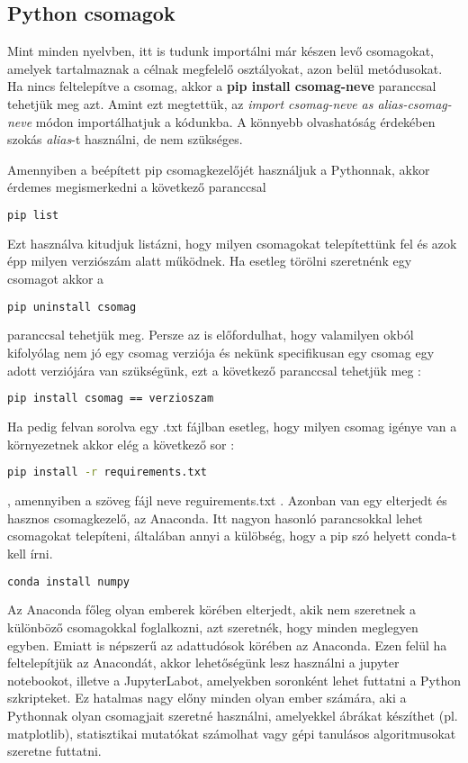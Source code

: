 \documentclass{article}
\theoremstyle{definition}
\theoremstyle{theorem}
\begin{document}
\subsection{Python csomagok}
Mint minden nyelvben, itt is tudunk importálni már készen levő csomagokat, amelyek tartalmaznak a célnak megfelelő osztályokat, azon belül metódusokat. Ha nincs feltelepítve a csomag, akkor a \textbf{pip install csomag-neve} paranccsal tehetjük meg azt.
Amint ezt megtettük, az \textit{import csomag-neve as alias-csomag-neve} módon importálhatjuk a kódunkba. A könnyebb olvashatóság érdekében szokás \textit{alias}-t használni, de nem szükséges.


Amennyiben a beépített pip csomagkezelőjét használjuk a Pythonnak, akkor érdemes megismerkedni a következő paranccsal
\begin{lstlisting}[language=bash]
    pip list
\end{lstlisting}
Ezt használva kitudjuk listázni, hogy milyen csomagokat telepítettünk fel és azok épp milyen verziószám alatt működnek. \newline
Ha esetleg törölni szeretnénk egy csomagot akkor a
\begin{lstlisting}[language=bash]
    pip uninstall csomag
\end{lstlisting}paranccsal tehetjük meg. Persze az is előfordulhat, hogy valamilyen okból kifolyólag nem jó egy csomag verziója és nekünk specifikusan egy csomag egy adott verziójára van szükségünk, ezt a következő paranccsal tehetjük meg :

    \begin{lstlisting}[language=bash]
  pip install csomag == verzioszam
\end{lstlisting}
Ha pedig felvan sorolva egy .txt fájlban esetleg, hogy milyen csomag igénye van a környezetnek akkor elég a következő sor :
\begin{lstlisting}[language=bash]
pip install -r requirements.txt
\end{lstlisting}
, amennyiben a szöveg fájl neve reguirements.txt . \newline
Azonban van egy elterjedt és hasznos csomagkezelő, az Anaconda. Itt nagyon hasonló parancsokkal lehet csomagokat telepíteni, általában\cite{Anaconda} annyi a külöbség, hogy a pip szó helyett conda-t kell írni.
\begin{lstlisting}[language=bash]
conda install numpy
\end{lstlisting}
Az Anaconda főleg olyan emberek körében elterjedt, akik nem szeretnek a különböző csomagokkal foglalkozni, azt szeretnék, hogy minden meglegyen egyben. Emiatt is népszerű az adattudósok körében az Anaconda. Ezen felül ha feltelepítjük az Anacondát, akkor lehetőségünk lesz használni a jupyter notebookot, illetve a JupyterLabot, amelyekben soronként lehet futtatni a Python szkripteket. Ez hatalmas nagy előny minden olyan ember számára, aki a Pythonnak olyan csomagjait szeretné használni, amelyekkel ábrákat készíthet (pl. matplotlib), statisztikai mutatókat számolhat vagy gépi tanulásos algoritmusokat szeretne futtatni.
\end{document}
